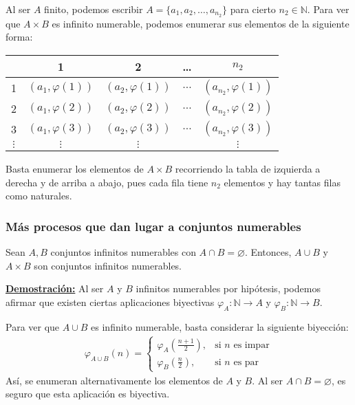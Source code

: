 \documentclass[12pt,a4paper]{article}
\newcommand{\N}{\mathbb{N}}
\newcommand{\dem}{
    \noindent \underline{\textbf{Demostración:}}
}
\begin{document}
\vspace{4mm}
Al ser $A$ finito, podemos escribir $A = \{a_1, a_2, \ldots, a_{n_2}\}$ para cierto $n_2 \in \N$.
Para ver que $A \times B$ es infinito numerable, podemos enumerar sus elementos de la siguiente forma:
\begin{center}
\begin{tabular}{c|cccc}
    & 1 & 2 & \ldots & $n_2$ \\
    \hline
    1 & $(a_1, \varphi(1))$ & $(a_2, \varphi(1))$ & $\ldots$ & $(a_{n_2}, \varphi(1))$ \\
    2 & $(a_1, \varphi(2))$ & $(a_2, \varphi(2))$ & $\ldots$ & $(a_{n_2}, \varphi(2))$ \\
    3 & $(a_1, \varphi(3))$ & $(a_2, \varphi(3))$ & $\ldots$ & $(a_{n_2}, \varphi(3))$ \\
    $\vdots$ & $\vdots$ & $\vdots$ & & $\vdots$ \\
\end{tabular}
\end{center}
\vspace{2mm}
Basta enumerar los elementos de $A \times B$ recorriendo la tabla de izquierda a derecha y de arriba a abajo,
pues cada fila tiene $n_2$ elementos y hay tantas filas como naturales.

\subsubsection{Más procesos que dan lugar a conjuntos numerables}
\hspace{3mm}
Sean $A, B$ conjuntos infinitos numerables con $A \cap B = \varnothing$.
Entonces, $A \cup B$ y $A \times B$ son conjuntos infinitos numerables.

\vspace{4mm}
\dem Al ser $A$ y $B$ infinitos numerables por hipótesis, podemos afirmar que existen ciertas
aplicaciones biyectivas \hspace{1mm} $\varphi_A : \N \to A$ \hspace{1mm} y \hspace{1mm} $\varphi_B : \N \to B$.

\vspace{2mm} \noindent
Para ver que $A \cup B$ es infinito numerable, basta considerar la siguiente biyección:
\\[-4ex]
\begin{align*}
    \varphi_{A \cup B} (n) =
    \begin{cases}
        \varphi_A\left(\frac{n+1}{2}\right), & \text{si } n \text{ es impar} \\
        \varphi_B\left(\frac{n}{2}\right), & \text{si } n \text{ es par}
    \end{cases}
\end{align*}
Así, se enumeran alternativamente los elementos de $A$ y $B$. Al ser $A \cap B = \varnothing$,
es seguro que esta aplicación es biyectiva.
\end{document}
